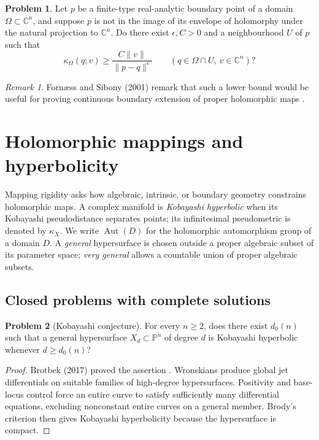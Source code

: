 \documentclass[11pt,reqno]{amsart}
\theoremstyle{definition}
\newtheorem{problem}{Problem}[section]
\theoremstyle{remark}
\newtheorem*{remark}{Remark}
\begin{document}
\begin{problem}\label{FS-3.22}
Let $p$ be a finite-type real-analytic boundary point of a domain $\Omega\subset\mathbb C^n$, and suppose $p$ is not in the image of its envelope of holomorphy under the natural projection to $\mathbb C^n$. Do there exist $\epsilon,C>0$ and a neighbourhood $U$ of $p$ such that
\[
 \kappa_\Omega(q;v)\geq
 \frac{C\|v\|}{\|p-q\|^\epsilon}
 \qquad(q\in\Omega\cap U,\ v\in\mathbb C^n)?
\]
\end{problem}
\begin{remark}
Forn\ae ss and Sibony (2001) remark that such a lower bound would be useful for proving continuous boundary extension of proper holomorphic maps \cite[Question~3.22]{FS2001}.
\end{remark}

\section{Holomorphic mappings and hyperbolicity}

Mapping rigidity asks how algebraic, intrinsic, or boundary geometry constrains holomorphic maps. A complex manifold is \emph{Kobayashi hyperbolic} when its Kobayashi pseudodistance separates points; its infinitesimal pseudometric is denoted by $\kappa_X$. We write $\operatorname{Aut}(D)$ for the holomorphic automorphism group of a domain $D$. A \emph{general} hypersurface is chosen outside a proper algebraic subset of its parameter space; \emph{very general} allows a countable union of proper algebraic subsets.

\subsection{Closed problems with complete solutions}

\begin{problem}[Kobayashi conjecture]\label{Siu-3.2-analytic}
For every $n\geq2$, does there exist $d_0(n)$ such that a general hypersurface $X_d\subset\mathbb P^n$ of degree $d$ is Kobayashi hyperbolic whenever $d\geq d_0(n)$?
\end{problem}
\begin{proof}
Brotbek (2017) proved the assertion \cite{SIU-Bro17}. Wronskians produce global jet differentials on suitable families of high-degree hypersurfaces. Positivity and base-locus control force an entire curve to satisfy sufficiently many differential equations, excluding nonconstant entire curves on a general member. Brody's criterion then gives Kobayashi hyperbolicity because the hypersurface is compact.
\end{proof}
\end{document}
